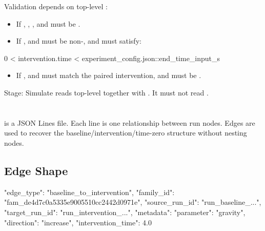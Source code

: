 \documentclass[11pt]{article}
\begin{document}
Validation depends on top-level :

\begin{itemize}
\item If , , , and  must be .
\item If ,  and  must be non-, and  must satisfy:
\end{itemize}

\begin{DocCode}
0 < intervention.time < experiment_config.json::end_time_input_s
\end{DocCode}

\begin{itemize}
\item If ,  and  must match the paired intervention, and  must be .
\end{itemize}

Stage: Simulate reads top-level  together with .
It must not read .

\section*{\texorpdfstring{}{run\_edges.jsonl}}
\label{sec:candidate-generation-run-edges}

 is a JSON Lines file.
Each line is one relationship between run nodes.
Edges are used to recover the baseline/intervention/time-zero structure without nesting nodes.

\subsection*{Edge Shape}

\begin{DocCode}
{
  "edge_type": "baseline_to_intervention",
  "family_id": "fam_de4d7c0a5335e9005510cc2442d0971e",
  "source_run_id": "run_baseline_...",
  "target_run_id": "run_intervention_...",
  "metadata": {
    "parameter": "gravity",
    "direction": "increase",
    "intervention_time": 4.0
  }
}
\end{DocCode}
\end{document}

